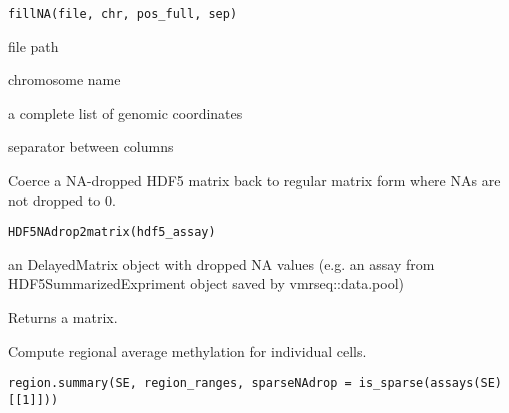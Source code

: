 \documentclass[letterpaper]{book}
\begin{document}
%
\begin{Usage}
\begin{verbatim}
fillNA(file, chr, pos_full, sep)
\end{verbatim}
\end{Usage}
%
\begin{Arguments}
\begin{ldescription}
\item[\code{file}] file path

\item[\code{chr}] chromosome name

\item[\code{pos\_full}] a complete list of genomic coordinates

\item[\code{sep}] separator between columns
\end{ldescription}
\end{Arguments}
%
\begin{Description}
Coerce a NA-dropped HDF5 matrix back to regular matrix form where NAs are not
dropped to 0.
\end{Description}
%
\begin{Usage}
\begin{verbatim}
HDF5NAdrop2matrix(hdf5_assay)
\end{verbatim}
\end{Usage}
%
\begin{Arguments}
\begin{ldescription}
\item[\code{hdf5\_assay}] an DelayedMatrix object with dropped NA values (e.g. an
assay from HDF5SummarizedExpriment object saved by vmrseq::data.pool)
\end{ldescription}
\end{Arguments}
%
\begin{Value}
Returns a matrix.
\end{Value}
%
\begin{Description}
Compute regional average methylation for individual cells.
\end{Description}
%
\begin{Usage}
\begin{verbatim}
region.summary(SE, region_ranges, sparseNAdrop = is_sparse(assays(SE)[[1]]))
\end{verbatim}
\end{Usage}
\end{document}
